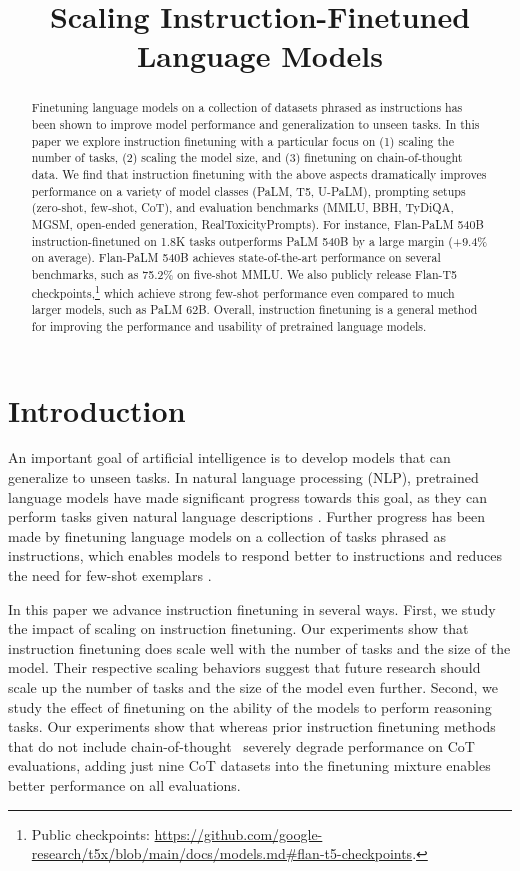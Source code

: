 \title{Scaling Instruction-Finetuned Language Models}

\begin{abstract}
 Finetuning language models on a collection of datasets phrased as instructions has been shown to improve model performance and generalization to unseen tasks. In this paper we explore instruction finetuning with a particular focus on (1) scaling the number of tasks, (2) scaling the model size, and (3) finetuning on chain-of-thought data. We find that instruction finetuning with the above aspects dramatically improves performance on a variety of model classes (PaLM, T5, U-PaLM), prompting setups (zero-shot, few-shot, CoT), and evaluation benchmarks (MMLU, BBH, TyDiQA, MGSM, open-ended generation, RealToxicityPrompts). For instance, Flan-PaLM 540B instruction-finetuned on 1.8K tasks outperforms PaLM 540B by a large margin (+9.4\% on average). Flan-PaLM 540B achieves state-of-the-art performance on several benchmarks, such as 75.2\% on five-shot MMLU. We also publicly release Flan-T5 checkpoints,\footnote{Public checkpoints: \url{https://github.com/google-research/t5x/blob/main/docs/models.md\#flan-t5-checkpoints}.} which achieve strong few-shot performance even compared to much larger models, such as PaLM 62B. Overall, instruction finetuning is a general method for improving the performance and usability of pretrained language models.
\end{abstract}

\section{Introduction}

An important goal of artificial intelligence is to develop models that can generalize to unseen tasks. In natural language processing (NLP), pretrained language models have made significant progress towards this goal, as they can perform tasks given natural language descriptions \citep[][\textit{inter alia}]{brown2020language}. Further progress has been made by finetuning language models on a collection of tasks phrased as instructions, which enables models to respond better to instructions and reduces the need for few-shot exemplars
\citep[][\textit{inter alia}]{ouyang2022training,wei2021finetuned,sanh2021multitask}.

In this paper we advance instruction finetuning in several ways. First, we study the impact of scaling on instruction finetuning. Our experiments show that instruction finetuning does scale well with the number of tasks and the size of the model. Their respective scaling behaviors suggest that future research should scale up the number of tasks and the size of the model even further. Second, we study the effect of finetuning on the ability of the models to perform reasoning tasks. Our experiments show that whereas prior instruction finetuning methods that do not include chain-of-thought~\citep[CoT;][]{wei2022chain} severely degrade performance on CoT evaluations, adding just nine CoT datasets into the finetuning mixture enables better performance on all evaluations.

